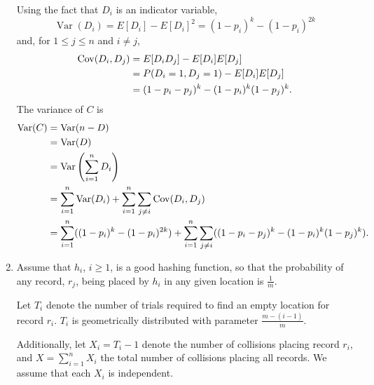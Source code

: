\documentclass{article}
\DeclareMathOperator{\Cov}{Cov}
\DeclareMathOperator{\Var}{Var}
\begin{document}
\begin{enumerate}
    Using the fact that $D_i$ is an indicator variable,
    \[
    \Var(D_i) = E[D_i] - E[D_i]^2 = (1-p_i)^k - (1-p_i)^{2k}
    \]
    and, for $1 \leq j \leq n$ and $i \neq j$,
    \begin{equation*}\begin{split}
    \Cov(D_i, D_j)  & = E[D_i D_j] - E[D_i]E[D_j] \\
                    & = P(D_i=1, D_j=1) - E[D_i]E[D_j] \\
                    & = (1-p_i-p_j)^k - (1-p_i)^k(1-p_j)^k \text.
    \end{split}\end{equation*}
    The variance of $C$ is
    \begin{equation*}\begin{split}
    \Var(C)     & = \Var(n - D) \\
                & = \Var(D) \\
                & = \Var\left(\sum_{i=1}^{n}D_i\right) \\
                & = \sum_{i=1}^{n}\Var(D_i) + \sum_{i=1}^{n}\sum_{j \neq i}\Cov( D_i, D_j ) \\
                & = \sum_{i=1}^{n}((1-p_i)^k - (1-p_i)^{2k}) + \sum_{i=1}^{n}\sum_{j \neq i}((1-p_i-p_j)^k - (1-p_i)^k(1-p_j)^k) \text.
    \end{split}\end{equation*}
\item
    Assume that $h_i$, $i \geq 1$, is a good hashing function, so that the probability of any record, $r_j$, being placed by $h_i$ in any given location is $\frac{1}{m}$.

    Let $T_i$ denote the number of trials required to find an empty location for record $r_i$.
    $T_i$ is geometrically distributed with parameter $\frac{m-(i-1)}{m}$.

    Additionally, let $X_i = T_i-1$ denote the number of collisions placing record $r_i$, and $X=\sum_{i=1}^{n}X_i$ the total number of collisions placing all records.
    We assume that each $X_i$ is independent.


\end{enumerate}
\end{document}
